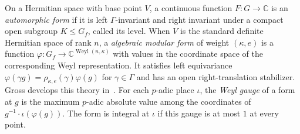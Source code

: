 \begin{definition}
\label{def:algebraic-form}
\emitthmsource
On a Hermitian space with base point $V$, a continuous function $F\colon G\to\mathbb C$ is an \emph{automorphic form} if it is left $\Gamma$-invariant and right invariant under a compact open subgroup $K\le G_f$, called its level.
When $V$ is the standard definite Hermitian space of rank $n$, a \emph{algebraic modular form} of weight $(\kappa,e)$ is a function $\varphi\colon G_f\to\mathbb C^{\operatorname{Weyl}(n,\kappa)}$ with values in the coordinate space of the corresponding Weyl representation. It satisfies left equivariance $\varphi(\gamma g)=\rho_{\kappa,e}(\gamma)\varphi(g)$ for $\gamma\in\Gamma$ and has an open right-translation stabilizer. Gross develops this theory in~\cite{Gross1999}.
For each $p$-adic place $\iota$, the \emph{Weyl gauge} of a form at $g$ is the maximum $p$-adic absolute value among the coordinates of $g^{-1}\cdot\iota(\varphi(g))$. The form is integral at $\iota$ if this gauge is at most $1$ at every point.
\end{definition}

